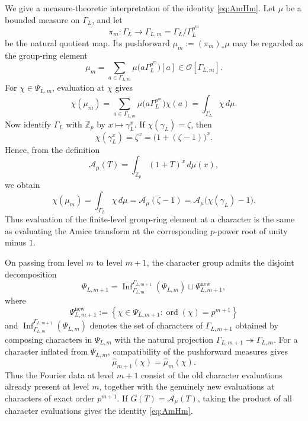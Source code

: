 \documentclass[11pt,table]{amsart}
\newcommand{\Z}{\mathbb{Z}}
\numberwithin{equation}{section}
\begin{document}
\par We give a measure-theoretic interpretation of the identity
\eqref{eq:AmHm}.  Let \(\mu\) be a bounded measure on \(\Gamma_L\), and
let
\[
        \pi_m:\Gamma_L\longrightarrow
        \Gamma_{L,m}=\Gamma_L/\Gamma_L^{p^m}
\]
be the natural quotient map.  Its pushforward
\(\mu_m:=(\pi_m)_*\mu\) may be regarded as the group-ring element
\[
        \mu_m
        =
        \sum_{a\in\Gamma_{L,m}}
        \mu\bigl(a\Gamma_L^{p^m}\bigr)[a]
        \in\mathcal O[\Gamma_{L,m}].
\]
For \(\chi\in\Psi_{L,m}\), evaluation at \(\chi\) gives
\[
        \chi(\mu_m)
        =
        \sum_{a\in\Gamma_{L,m}}
        \mu\bigl(a\Gamma_L^{p^m}\bigr)\chi(a)
        =
        \int_{\Gamma_L}\chi\,d\mu.
\]
Now identify \(\Gamma_L\) with \(\Z_p\) by
\(x\mapsto\gamma_L^x\).  If
\(\chi(\gamma_L)=\zeta\), then
\[
        \chi(\gamma_L^x)
        =
        \zeta^x
        =
        \bigl(1+(\zeta-1)\bigr)^x.
\]
Hence, from the definition
\[
        \mathcal A_\mu(T)
        =
        \int_{\Z_p}(1+T)^x\,d\mu(x),
\]
we obtain
\[
        \chi(\mu_m)
        =
        \int_{\Gamma_L}\chi\,d\mu
        =
        \mathcal A_\mu(\zeta-1)
        =
        \mathcal A_\mu\bigl(\chi(\gamma_L)-1\bigr).
\]
Thus evaluation of the finite-level group-ring element at a character
is the same as evaluating the Amice transform at the corresponding
\(p\)-power root of unity minus \(1\).
\par On passing from level \(m\) to level \(m+1\), the character group
admits the disjoint decomposition
\[
        \Psi_{L,m+1}
        =
        \operatorname{Inf}_{\Gamma_{L,m}}^{\Gamma_{L,m+1}}
        (\Psi_{L,m})
        \sqcup
        \Psi_{L,m+1}^{\mathrm{new}},
\]
where
\[
        \Psi_{L,m+1}^{\mathrm{new}}
        :=
        \left\{
        \chi\in\Psi_{L,m+1}:
        \operatorname{ord}(\chi)=p^{m+1}
        \right\}
\]
and \(\operatorname{Inf}_{\Gamma_{L,m}}^{\Gamma_{L,m+1}}(\Psi_{L,m})\)
denotes the set of characters of \(\Gamma_{L,m+1}\) obtained by
composing characters in \(\Psi_{L,m}\) with the natural projection
\(\Gamma_{L,m+1}\twoheadrightarrow\Gamma_{L,m}\).
For a character inflated from \(\Psi_{L,m}\), compatibility of the
pushforward measures gives
\[
        \widehat\mu_{m+1}(\chi)
        =
        \widehat\mu_m(\chi).
\]
Thus the Fourier data at level \(m+1\) consist of the old character
evaluations already present at level \(m\), together with the genuinely
new evaluations at characters of exact order \(p^{m+1}\). If \(G(T)=\mathcal A_\mu(T)\), taking the product of all character
evaluations gives the identity \eqref{eq:AmHm}.
\end{document}
